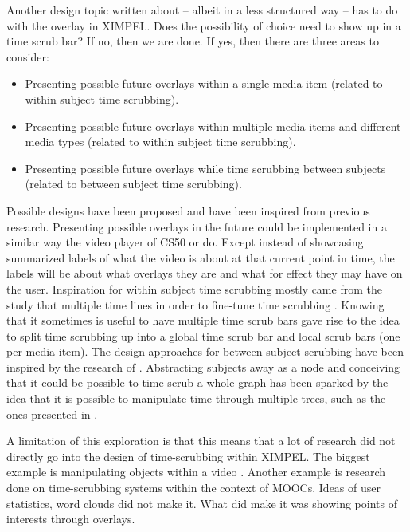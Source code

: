 Another design topic written about -- albeit in a less structured way -- has to do with the overlay in XIMPEL. Does the possibility of choice need to show up in a time scrub bar? If no, then we are done. If yes, then there are three areas to consider:
\begin{itemize}
    \item Presenting possible future overlays within a single media item (related to within subject time scrubbing).
    \item Presenting possible future overlays within multiple media items and different media types (related to within subject time scrubbing).
    \item Presenting possible future overlays while time scrubbing between subjects (related to between subject time scrubbing).
\end{itemize}

Possible designs have been proposed and have been inspired from previous research. Presenting possible overlays in the future could be implemented in a similar way the video player of CS50 or \cite{automaticsection2015} do. Except instead of showcasing summarized labels of what the video is about at that current point in time, the labels will be about what overlays they are and what for effect they may have on the user. Inspiration for within subject time scrubbing mostly came from the study that multiple time lines in order to fine-tune time scrubbing \cite{multipletimeline1999}. Knowing that it sometimes is useful to have multiple time scrub bars gave rise to the idea to split time scrubbing up into a global time scrub bar and local scrub bars (one per media item). The design approaches for between subject scrubbing have been inspired by the research of \cite{videotree2010}. Abstracting subjects away as a node and conceiving that it could be possible to time scrub a whole graph has been sparked by the idea that it is possible to manipulate time through multiple trees, such as the ones presented in \cite{videotree2010}. 

A limitation of this exploration is that this means that a lot of research did not directly go into the design of time-scrubbing within XIMPEL. The biggest example is manipulating objects within a video \cite{nguyen2013, shah2013, goldman2008, dragicevic2008, kimber2007}. Another example is research done on time-scrubbing systems within the context of MOOCs. Ideas of user statistics\cite{kim2014}, word clouds\cite{yadav2015} did not make it. What did make it was showing points of interests through overlays\cite{yadav2015}. 


